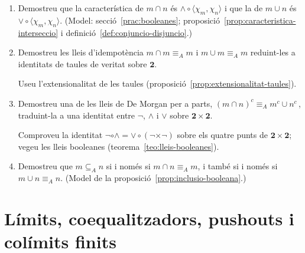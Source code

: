 \begin{enumerate}[resume]
  \item Demostreu que la característica de \(m\cap n\) és \(\wedge\circ\langle\chi_m,\chi_n\rangle\) i que la de \(m\cup n\) és \(\vee\circ\langle\chi_m,\chi_n\rangle\). (Model: secció~\ref{prac:booleanes}; proposició~\ref{prop:caracteristica-interseccio} i definició~\ref{def:conjuncio-disjuncio}.)

  \item Demostreu les lleis d'idempotència \(m\cap m\equiv_A m\) i \(m\cup m\equiv_A m\) reduint-les a identitats de taules de veritat sobre \(\mathbf2\). \begin{indicacio}Useu l'extensionalitat de les taules (proposició~\ref{prop:extensionalitat-taules}).\end{indicacio}

  \item Demostreu una de les lleis de De Morgan per a parts, \((m\cap n)^c\equiv_A m^c\cup n^c\, \), traduint-la a una identitat entre \(\neg\), \(\wedge\) i \(\vee\) sobre \(\mathbf2\times\mathbf2\). \begin{indicacio}Comproveu la identitat \(\neg\circ\wedge=\vee\circ(\neg\times\neg)\) sobre els quatre punts de \(\mathbf2\times\mathbf2\); vegeu les lleis booleanes (teorema~\ref{teo:lleis-booleanes}).\end{indicacio}

  \item Demostreu que \(m\subseteq_A n\) si i només si \(m\cap n\equiv_A m\), i també si i només si \(m\cup n\equiv_A n\). (Model de la proposició~\ref{prop:inclusio-booleana}.)
\end{enumerate}

\section{Límits, coequalitzadors, pushouts i colímits finits}


